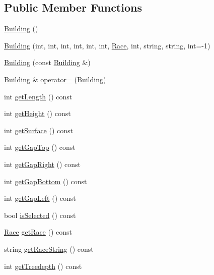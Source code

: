\subsection*{Public Member Functions}
\begin{DoxyCompactItemize}
\item 
\hyperlink{classghost_1_1Building_a57d16dc6bf4b41cbcf67f2b51a416410}{Building} ()
\item 
\hyperlink{classghost_1_1Building_a453e89a96f541b6f87360ba18ccffaf0}{Building} (int, int, int, int, int, int, \hyperlink{namespaceghost_a8b1db75c40c6980adcf244ddccc0324b}{Race}, int, string, string, int=-\/1)
\item 
\hyperlink{classghost_1_1Building_a4fec1171ac6ce8c22e44681200d9df3d}{Building} (const \hyperlink{classghost_1_1Building}{Building} \&)
\item 
\hyperlink{classghost_1_1Building}{Building} \& \hyperlink{classghost_1_1Building_a36eaa020dfdde36ded82afc6d29fbbab}{operator=} (\hyperlink{classghost_1_1Building}{Building})
\item 
int \hyperlink{classghost_1_1Building_ae5adc91a4fb5c3ec026e8542eb8be76a}{get\-Length} () const 
\item 
int \hyperlink{classghost_1_1Building_abb174f1ec24c6936c64e95fe8cbddc48}{get\-Height} () const 
\item 
int \hyperlink{classghost_1_1Building_ad2239fc3e97e16d32f8c59377c65d235}{get\-Surface} () const 
\item 
int \hyperlink{classghost_1_1Building_aacd84477ad15ae6f40394e3d429ccb4e}{get\-Gap\-Top} () const 
\item 
int \hyperlink{classghost_1_1Building_a7858048798ed743c3251e314faf387b5}{get\-Gap\-Right} () const 
\item 
int \hyperlink{classghost_1_1Building_a1841953866459a82a05b42cb2377ba8b}{get\-Gap\-Bottom} () const 
\item 
int \hyperlink{classghost_1_1Building_ae5f7027727b6d00be6a224413806b8a3}{get\-Gap\-Left} () const 
\item 
bool \hyperlink{classghost_1_1Building_ae4636ee68f4f2493fd130ae2ebbada97}{is\-Selected} () const 
\item 
\hyperlink{namespaceghost_a8b1db75c40c6980adcf244ddccc0324b}{Race} \hyperlink{classghost_1_1Building_a8ed6ee863c01f1c017714a554d64606c}{get\-Race} () const 
\item 
string \hyperlink{classghost_1_1Building_ae4954b3cc1da4b93d66c2b75877e56d4}{get\-Race\-String} () const 
\item 
int \hyperlink{classghost_1_1Building_a8863fda0284ccf1b765821c0d8a3e0eb}{get\-Treedepth} () const 
\end{DoxyCompactItemize}
